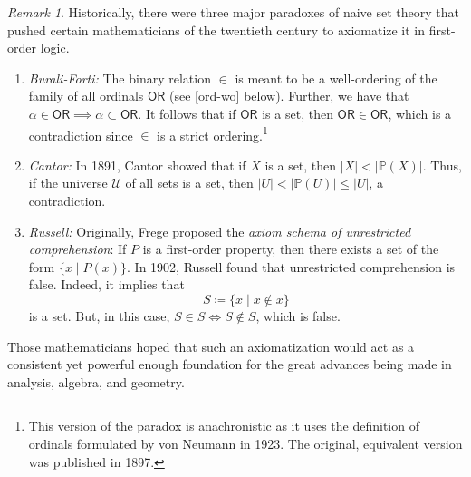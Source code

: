 \documentclass[10pt,letterpaper,cm]{nupset}
\theoremstyle{definition}
\theoremstyle{theorem}
\theoremstyle{remark}
\newtheorem{remark}[definition]{Remark}
\renewcommand{\P}{\mathbb P}
\newcommand{\1}{\mathbf{1}}
\newcommand{\0}{\vec 0}
\newcommand{\ord}{\mathsf{OR}}
\begin{document}
\begin{remark}\label{paradox}
Historically, there were three major paradoxes of naive set theory that pushed certain mathematicians of the twentieth century to axiomatize it in first-order logic. 
\begin{enumerate}
\item \textit{Burali-Forti:} The binary relation $\in$ is meant to be a well-ordering of the family of all ordinals $\ord$ (see \cref{ord-wo} below). Further, we have that $\alpha \in \ord \implies \alpha \subset \ord$. It follows that if $\ord$ is a set, then $\ord \in \ord$, which is a contradiction since $\in$ is a strict ordering.\footnote{This version of the paradox is anachronistic as it uses the definition of ordinals formulated by von Neumann in 1923. The original, equivalent version was published in 1897.} 
\item \textit{Cantor:} In 1891, Cantor showed that if $X$ is a set, then $\lvert{X}\rvert < \lvert{\P(X)}\rvert$. Thus, if the universe $\mathcal{U}$ of all sets is a set, then $\lvert{U}\rvert < \lvert{\P(U)}\rvert \leq \lvert{U}\rvert$, a contradiction. 
\item \textit{Russell:} Originally, Frege proposed the \textit{axiom schema of unrestricted comprehension}: If $P$ is a first-order property, then there exists a set of the form $\{x \mid P(x)\}$. In 1902, Russell found that unrestricted comprehension is false. Indeed,  it implies that $$S \coloneqq \{x \mid x \notin x\}$$ is a set. But, in this case, $S \in S  \iff S \notin S$, which is false. 
\end{enumerate}
Those mathematicians hoped that such an axiomatization would act as a consistent yet powerful enough foundation for the great advances being made in analysis, algebra, and geometry.
\end{remark}
\end{document}
